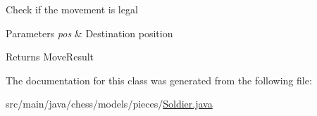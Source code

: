 Check if the movement is legal


\begin{DoxyParams}{Parameters}
{\em pos} & Destination position \\
\hline
\end{DoxyParams}
\begin{DoxyReturn}{Returns}
Move\+Result 
\end{DoxyReturn}


The documentation for this class was generated from the following file\+:\begin{DoxyCompactItemize}
\item 
src/main/java/chess/models/pieces/\mbox{\hyperlink{_soldier_8java}{Soldier.\+java}}\end{DoxyCompactItemize}

